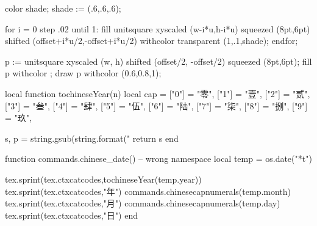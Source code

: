    color shade;
    shade := (.6,.6,.6);

    for i = 0 step .02 until 1:
        fill unitsquare xyscaled (w-i*u,h-i*u) squeezed (8pt,6pt)
             shifted (offset+i*u/2,-offset+i*u/2)
             withcolor transparent (1,.1,shade);
    endfor;

    p := unitsquare xyscaled (w, h) shifted (offset/2, -offset/2) squeezed (8pt,6pt);
    fill p withcolor ;
    draw p withcolor (0.6,0.8,1);
\stopuniqueMPgraphic
{}%
\def\startEnglish{\dostartEnglish}

\long{}

\def\startEnglishWithoutWhiteSpace{\dostartEnglishWithoutWhiteSpace}

\long{}
\startluacode
local function tochineseYear(n)
	local cap = {
		["0"] = "零",
		["1"] = "壹",
		["2"] = "贰",
		["3"] = "叁",
		["4"] = "肆",
		["5"] = "伍",
		["6"] = "陆",
		["7"] = "柒",
		["8"] = "捌",
		["9"] = "玖",
	}

	s, p = string.gsub(string.format("%
	return s
end

function commands.chinese_date() -- wrong namespace
	local temp = os.date("*t")

	tex.sprint(tex.ctxcatcodes,tochineseYear(temp.year))
	tex.sprint(tex.ctxcatcodes,"年")
	commands.chinesecapnumerals(temp.month)
	tex.sprint(tex.ctxcatcodes,"月")
	commands.chinesecapnumerals(temp.day)
	tex.sprint(tex.ctxcatcodes,"日")
end
\stopluacode


\chardef\kindofpagetextareas\plusone

\let\stdfootnote\footnote
\def\footnote#1{%
\stdfootnote{\setscript[hanzi]#1}%
}

\problem{}
\stopenvironment

